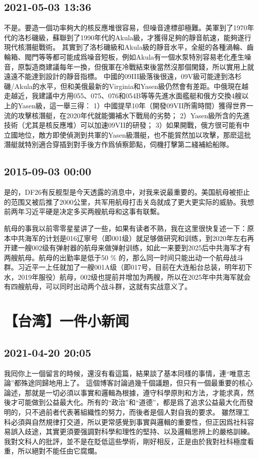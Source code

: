 \documentclass[twocolumn]{ctexart}
\begin{document}
\subsection*{2021-05-03 13:36}

不是。要造一個功率夠大的核反應堆很容易，但噪音達標卻極難。美軍到了1970年代的洛杉磯級，蘇聯到了1990年代的Akula級，才獲得足夠的靜音航速，能夠遂行現代核潛艇戰術。
其實到了洛杉磯級和Akula級的靜音水平，全艇的各種渦輪、齒輪箱、閥門等等都可能成爲噪音短板，例如Akula有一個水泵特別容易老化產生噪音，原製造商建議每年一換，但俄軍在冷戰結束後當然沒那個閑錢，所以實用上就遠遠不能達到設計的靜音指標。
中國的09III級落後很遠，09V級可能達到洛杉磯/Akula的水平，但和美俄最新的Virginia和Yasen級仍然會有差距。中俄現在越走越近，我建議中方用055、075、076和054B等等先進水面艦艇和俄方交換4艘以上的Yasen級，這一舉三得：
1）中國提早10年（開發09VII所需時間）獲得世界一流的攻擊核潛艇，在2020年代就能彌補水下戰局的劣勢；
2）Yasen級所含的先進技術（尤其是核反應堆）可以加速09VII的研發；
3）如果開戰，俄方很可能有中立國地位，敵方即使偵測到共軍的Yasen級潛艇，也不能貿然加以攻擊，那麽這批潛艇就特別適合穿插到對手後方作爲偵察節點，伺機打擊第二綫補給船隊。
\subsection*{2015-09-03 00:00}
是的，DF26有反舰型是今天透露的消息中，对我来说最重要的。美国航母被拒止的范围又被后推了2000公里，共军用航母打击关岛就成了更大更实际的威胁。我想前两年习近平硬是决定多买两艘航母和这事有联繫。

航母的事我以前零零星星讲了一些，如果有读者不熟，我在这里很快复述一下：原本中共海军的计划是016辽寧号（即001级）就足够做研究和训练，到2020年左右再开建一艘002级有弹射器的航母来做弹射训练，如此一来要到2025后中共海军才有两艘航母。航母的出勤率是低于50 \% 的，那么同一时间只能出动一个航母战斗群。习近平一上任就加了一艘001A级（即017号，目前在大连船台总装，明年初下水，2019年服役）航母，002级也提前并增加为两艘，所以在2025年中共海军就会有四艘航母，可以同时出动两个战斗群，这就有实战意义了。\section*{【台湾】一件小新闻}
\subsection*{2021-04-20 20:05}

我囘你上一個留言的時候，還沒有看這篇，結果談了基本同樣的事情，連“唯意志論”都殊途同歸地用上了。
這個博客討論過幾千個議題，但只有一個最重要的核心論述，那就是一切必須以事實和邏輯為根據，遵守科學原則和方法，才能求真，然後才可能做到公益最大化。所有的“政治”和“道德”，都是爲了追求公益最大化而發明的，只不過前者代表著組織性的努力，而後者是個人對自我的要求。
雖然理工科必須與自然規律打交道，所以更常感覺到事實與邏輯的重要性，但正因爲社科容易誤入歧途，其實更須要强調對科學和理性的堅持、以及邏輯思辨上的嚴格訓練。我對文科人的批評，並不是在貶低這些學術，剛好相反，正是由於我對社科極度看重，所以絕對不能任由它腐爛。
\end{document}

